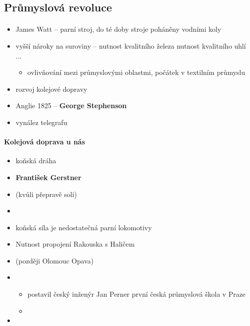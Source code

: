 \subsection{Průmyslová revoluce}
\paragraph{}
\begin{itemize}
\item James Watt -- parní stroj, do té doby stroje poháněny vodními koly
\item vyšší nároky na suroviny -- nutnost kvalitního železa \ra nutnost kvalitního uhlí \ra ... 
	\begin{itemize}
	\item ovlivňování mezi průmyslovými oblastmi, počátek v textilním průmyslu
	\end{itemize}
\item rozvoj kolejové dopravy
\item Anglie 1825 -- \textbf{George Stephenson}
\item vynález telegrafu
\end{itemize}

\paragraph{Kolejová doprava u nás}
\begin{itemize}
\item koňská dráha
\item \textbf{František Gerstner}
\item {} (kvůli přepravě soli)
\item {}
\item koňská síla je nedostatečná \ra parní lokomotivy
\item Nutnost propojení Rakouska s Haličem
\item {} (později  \ra Olomouc \ra Opava)
\item {}
	\begin{itemize}
	\item postavil český inženýr Jan Perner \ra první česká průmyslová škola v Praze
	\item 
	\end{itemize}
\item {}
\end{itemize}

